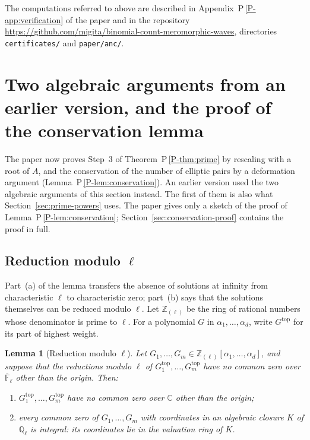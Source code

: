 \documentclass[11pt]{article}
\newtheorem{lemma}[theorem]{Lemma}
\newcommand{\CC}{\mathbb C}
\newcommand{\QQ}{\mathbb Q}
\newcommand{\ZZ}{\mathbb Z}
\newcommand{\FF}{\mathbb F}
\numberwithin{equation}{section}
\begin{document}
The computations referred to above are described in
Appendix~P\,\ref{P-app:verification} of the paper and in the repository
\url{https://github.com/migita/binomial-count-meromorphic-waves},
directories \texttt{certificates/} and \texttt{paper/anc/}.


\section{Two algebraic arguments from an earlier version, and the
proof of the conservation lemma}
\label{sec:earlier-version}

The paper now proves Step~3 of Theorem~P\,\ref{P-thm:prime} by
rescaling with a root of \(A\), and the conservation of the number of
elliptic pairs by a deformation argument
(Lemma~P\,\ref{P-lem:conservation}). An earlier version used the two
algebraic arguments of this section instead. The first of them is also
what Section~\ref{sec:prime-powers} uses. The paper gives only a sketch
of the proof of Lemma~P\,\ref{P-lem:conservation};
Section~\ref{sec:conservation-proof} contains the proof in full.

\subsection{Reduction modulo \texorpdfstring{\(\ell\)}{l}}

Part~(a) of the lemma transfers the absence of solutions at infinity
from characteristic \(\ell\) to characteristic zero; part~(b) says that
the solutions themselves can be reduced modulo \(\ell\).
Let \(\ZZ_{(\ell)}\) be the ring of rational numbers whose denominator
is prime to \(\ell\). For a polynomial \(G\) in
\(\alpha_1,\ldots,\alpha_d\), write \(G^{\mathrm{top}}\) for its part of
highest weight.

\begin{lemma}[Reduction modulo \(\ell\)]\label{lem:reduction}
Let \(G_1,\ldots,G_m\in\ZZ_{(\ell)}[\alpha_1,\ldots,\alpha_d]\), and
suppose that the reductions modulo \(\ell\) of
\(G_1^{\mathrm{top}},\ldots,G_m^{\mathrm{top}}\) have no common zero
over \(\overline{\FF}_\ell\) other than the origin. Then:
\begin{enumerate}
\item[\textup{(a)}] \(G_1^{\mathrm{top}},\ldots,G_m^{\mathrm{top}}\)
have no common zero over \(\CC\) other than the origin;
\item[\textup{(b)}] every common zero of \(G_1,\ldots,G_m\) with
coordinates in an algebraic closure \(K\) of \(\QQ_\ell\) is integral:
its coordinates lie in the valuation ring of \(K\).
\end{enumerate}
\end{lemma}
\end{document}
